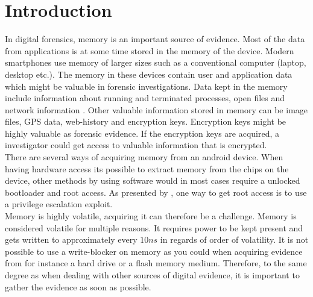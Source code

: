 \section{Introduction}


In digital forensics, memory is an important source of evidence. Most of the data from applications is at some time 
stored in the memory of the device. Modern smartphones use memory of larger sizes such as a conventional computer (laptop, 
desktop etc.). The memory in these devices contain user and application data which might be valuable in forensic 
investigations. Data kept in the memory include information about running and terminated processes, open files and 
network information \cite{acq_vol_android_mem}. Other valuable information stored in memory can be image files, GPS data, 
web-history and encryption keys. Encryption keys might be highly valuable as forensic evidence. If the encryption keys 
are acquired, a investigator could get access to valuable information that is encrypted. \\

There are several ways of acquiring memory from an android device. When having hardware access its possible 
to extract memory from the chips on the device, other methods by using software would in most cases require 
a unlocked bootloader and root access. As presented by \cite{acq_vol_android_mem}, 
one way to get root access is to use a privilege escalation exploit. \\%




Memory is highly volatile, acquiring it can therefore be a challenge. Memory is 
considered volatile for multiple reasons. It requires  power to be kept present
\cite{the_art_of_mem} and gets written to approximately every $10ns$ in regards
of order of volatility. %
It is not possible to use a write-blocker on memory as you could when acquiring 
evidence from for instance a hard drive or a flash memory medium. Therefore, to 
the same degree as when dealing with other sources of digital evidence, it is 
important to gather the evidence as soon as possible. \\

